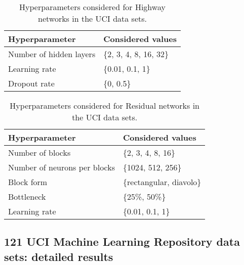 \documentclass{article}
\begin{document}
\begin{table}[htp]
\begin{center}
\caption{Hyperparameters considered for Highway networks in the UCI data sets.}

\begin{tabular}{ll}
\toprule
Hyperparameter  & Considered values \\ 
\midrule
  Number of hidden layers & \{2, 3, 4, 8, 16, 32\} \\
  Learning rate & \{0.01, 0.1, 1\} \\
  Dropout rate & \{0, 0.5\} \\
\bottomrule
\end{tabular}
\end{center}

\end{table}




\begin{table}[htp]
\begin{center}
\caption{Hyperparameters considered for Residual networks in the UCI data sets.}

\begin{tabular}{ll}
\toprule
Hyperparameter  & Considered values \\ 
\midrule
  Number of blocks & \{2, 3, 4, 8, 16\} \\
  Number of neurons per blocks & \{1024, 512, 256\} \\
  Block form & \{rectangular, diavolo\} \\
  Bottleneck & \{25\%, 50\%\} \\
  Learning rate & \{0.01, 0.1, 1\} \\
\bottomrule
\end{tabular}
\end{center}

\end{table}



\clearpage

\subsection{121 UCI Machine Learning Repository data sets: detailed results}
\end{document}
